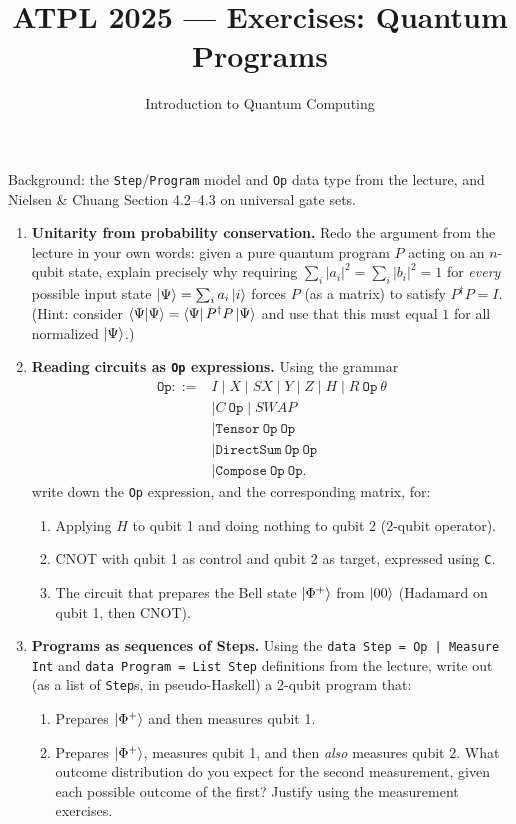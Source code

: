 \documentclass[11pt]{article}
\title{ATPL 2025 --- Exercises: Quantum Programs}
\author{Introduction to Quantum Computing}
\date{}
\begin{document}
\maketitle

Background: the \texttt{Step}/\texttt{Program} model and \texttt{Op} data
type from the lecture, and Nielsen \& Chuang Section 4.2--4.3 on
universal gate sets.

\begin{enumerate}[label=\textbf{Exercise \arabic*.}, leftmargin=2.2cm]

\item \textbf{Unitarity from probability conservation.}
Redo the argument from the lecture in your own words: given a pure
quantum program $P$ acting on an $n$-qubit state, explain precisely why
requiring $\sum_i |a_i|^2 = \sum_i |b_i|^2 = 1$ for \emph{every} possible
input state $\ket\Psi=\sum_i a_i\ket i$ forces $P$ (as a matrix) to
satisfy $P^\dagger P = I$. (Hint: consider
$\braket{\Psi}{\Psi} = \bra\Psi P^\dagger P\ket\Psi$ and use that this
must equal $1$ for all normalized $\ket\Psi$.)

\item \textbf{Reading circuits as \texttt{Op} expressions.}
Using the grammar
\[
\begin{aligned}
\texttt{Op} ::= {}&
    I \mid X \mid SX \mid Y \mid Z \mid H \mid R\ \texttt{Op}\ \theta \\
  &\mid C\ \texttt{Op} \mid SWAP \\
  &\mid \texttt{Tensor}\ \texttt{Op}\ \texttt{Op} \\
  &\mid \texttt{DirectSum}\ \texttt{Op}\ \texttt{Op} \\
  &\mid \texttt{Compose}\ \texttt{Op}\ \texttt{Op}.
\end{aligned}
\]
write down the \texttt{Op} expression, and the corresponding matrix, for:
\begin{enumerate}[label=(\alph*)]
\item Applying $H$ to qubit 1 and doing nothing to qubit 2
(2-qubit operator).
\item CNOT with qubit 1 as control and qubit 2 as target, expressed using
\texttt{C}.
\item The circuit that prepares the Bell state $\ket{\Phi^+}$ from
$\ket{00}$ (Hadamard on qubit 1, then CNOT).
\end{enumerate}

\item \textbf{Programs as sequences of Steps.}
Using the \texttt{data Step = Op | Measure Int} and
\texttt{data Program = List Step} definitions from the lecture, write
out (as a list of \texttt{Step}s, in pseudo-Haskell) a 2-qubit program
that:
\begin{enumerate}[label=(\alph*)]
\item Prepares $\ket{\Phi^+}$ and then measures qubit 1.
\item Prepares $\ket{\Phi^+}$, measures qubit 1, and then \emph{also}
measures qubit 2. What outcome distribution do you expect for the second
measurement, given each possible outcome of the first? Justify using the
measurement exercises.
\end{enumerate}


\end{enumerate}
\end{document}
